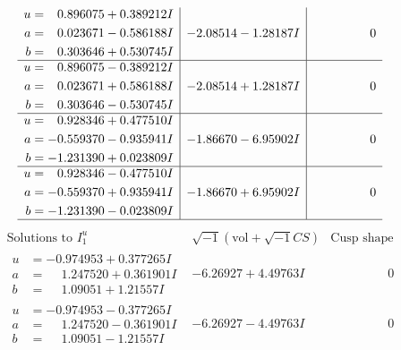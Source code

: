 \documentclass[1p]{elsarticle_modified}
\theoremstyle{definition}
\newcommand{\I}{\sqrt{-1}}
\begin{document}
$$\begin{array}{c|c|c}
\begin{aligned}
u &= \phantom{-}0.896075 + 0.389212 I \\
a &= \phantom{-}0.023671 - 0.586188 I \\
b &= \phantom{-}0.303646 + 0.530745 I\end{aligned}
 & -2.08514 - 1.28187 I & \phantom{-0.000000 } 0 \\ \hline\begin{aligned}
u &= \phantom{-}0.896075 - 0.389212 I \\
a &= \phantom{-}0.023671 + 0.586188 I \\
b &= \phantom{-}0.303646 - 0.530745 I\end{aligned}
 & -2.08514 + 1.28187 I & \phantom{-0.000000 } 0 \\ \hline\begin{aligned}
u &= \phantom{-}0.928346 + 0.477510 I \\
a &= -0.559370 - 0.935941 I \\
b &= -1.231390 + 0.023809 I\end{aligned}
 & -1.86670 - 6.95902 I & \phantom{-0.000000 } 0 \\ \hline\begin{aligned}
u &= \phantom{-}0.928346 - 0.477510 I \\
a &= -0.559370 + 0.935941 I \\
b &= -1.231390 - 0.023809 I\end{aligned}
 & -1.86670 + 6.95902 I & \phantom{-0.000000 } 0\\
 \hline 
 \end{array}$$\newpage$$\begin{array}{c|c|c}  
\text{Solutions to }I^u_{1}& \I (\text{vol} + \sqrt{-1}CS) & \text{Cusp shape}\\
 \hline 
\begin{aligned}
u &= -0.974953 + 0.377265 I \\
a &= \phantom{-}1.247520 + 0.361901 I \\
b &= \phantom{-}1.09051 + 1.21557 I\end{aligned}
 & -6.26927 + 4.49763 I & \phantom{-0.000000 } 0 \\ \hline\begin{aligned}
u &= -0.974953 - 0.377265 I \\
a &= \phantom{-}1.247520 - 0.361901 I \\
b &= \phantom{-}1.09051 - 1.21557 I\end{aligned}
 & -6.26927 - 4.49763 I & \phantom{-0.000000 } 0 \\ \hline\begin{aligned}

\end{aligned}
\end{array}$$
\end{document}
